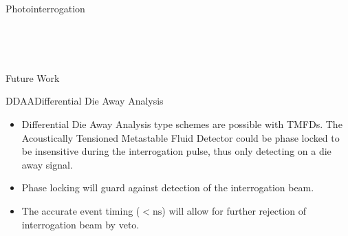 \begin{pucol}{5}{12}
\begin{pucell}{5}{8}{Photointerrogation}{}
\begin{pucol}{3}{8}
\begin{pucell}{3}{3}{}{}
      \end{pucell} \\
      \vspace*{\fill}
      \begin{pucell}{3}{5}{}{}
      \end{pucell}
    \end{pucol}%
  \end{pucell}
  \vspace*{\fill} \\
  \begin{pucell}{5}{4}{Future Work}{}
    \begin{pucell}{2}{4}{DDAA}{Differential Die Away Analysis}
      \vspace*{\fill}
      \begin{itemize}
        \item Differential Die Away Analysis type schemes are possible with TMFDs. The Acoustically Tensioned Metastable Fluid Detector could be phase locked to be insensitive during the interrogation pulse, thus only detecting on a die away signal.
        \item Phase locking will guard against detection of the interrogation beam.
        \item The accurate event timing ($<\mathrm{ns}$) will allow for further rejection of interrogation beam by veto.
      \end{itemize}
      \vspace*{\fill}
    \end{pucell}%
    \hspace*{\fill}
    \begin{pucell}{3}{4}{}{}
    \end{pucell}
  \end{pucell}%
\end{pucol}
